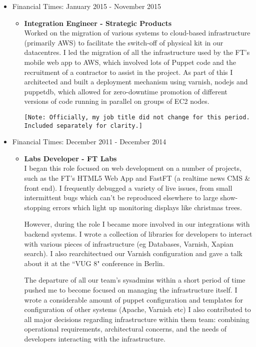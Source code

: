 \documentclass[a4paper]{article}
\begin{document}
\begin{itemize}
\item Financial Times: January 2015 - November 2015
\begin{itemize}

\item {\bf Integration Engineer - Strategic Products} \\
Worked on the migration of various systems to cloud-based infrastructure (primarily AWS) to facilitate the switch-off of physical kit in our datacentres.  I led the migration of all the infrastructure used by the FT's mobile web app to AWS, which involved lots of Puppet code and the recruitment of a contractor to assist in the project. As part of this I architected and built a deployment mechanism using varnish, nodejs and puppetdb, which allowed for zero-downtime promotion of different versions of code running in parallel on groups of EC2 nodes. 

\small{\texttt{[Note: Officially, my job title did not change for this period. Included separately for clarity.]}}
\end{itemize}

\item Financial Times: December 2011 - December 2014
\begin{itemize}
\item {\bf Labs Developer - FT Labs}\\
I began this role focused on web development on a number of projects, such as the FT's HTML5 Web App and FastFT (a realtime news CMS \& front end). I frequently debugged a variety of live issues, from small intermittent bugs which can't be reproduced elsewhere to large show-stopping errors which light up monitoring displays like christmas trees.\par

However, during the role I became more involved in our integrations with backend systems. I wrote a collection of libraries for developers to interact with various pieces of infrastructure (eg Databases, Varnish, Xapian search). I also rearchitectued our Varnish configuration and gave a talk about it at the ``VUG 8" conference in Berlin.\par

The departure of all our team's sysadmins within a short period of time pushed me to become focused on managing the infrastructure itself.  I wrote a considerable amount of puppet configuration and  templates for configuration of other systems (Apache, Varnish etc) I also contributed to all major decisions regarding infrastructure within them team: combining operational requirements, architectural concerns, and the needs of developers interacting with the infrastructure.\par


\end{itemize}
\end{itemize}
\end{document}
